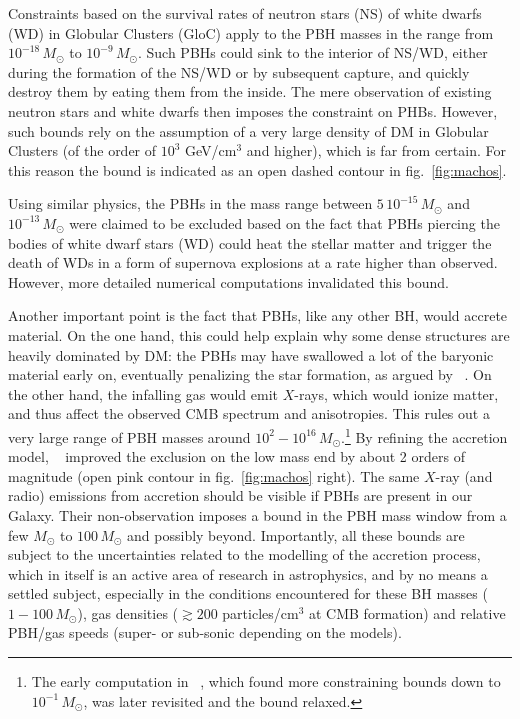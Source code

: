 Constraints based on the survival rates of neutron stars (NS) of white dwarfs (WD) in Globular Clusters (GloC) apply to the PBH masses in the range
from  $10^{-18}\, M_\odot$ to $10^{-9} \, M_\odot$. Such PBHs could sink to the interior of NS/WD, either during the formation of the NS/WD or by subsequent capture, and quickly destroy them by eating them from the inside. The mere observation of existing neutron stars and white dwarfs then imposes the constraint on PHBs. However, such bounds rely on the assumption of a very large density of DM in Globular Clusters (of the order of $10^3$ GeV/cm$^3$ and higher), which is far from certain. For this reason the bound is indicated as an open dashed contour in fig.~\ref{fig:machos}.

Using similar physics, the PBHs in the mass range between $5\, 10^{-15} \, M_\odot$ and $10^{-13} \, M_\odot$ were claimed to be excluded based on the fact that PBHs piercing the bodies of white dwarf stars (WD) could heat the stellar matter and trigger the death of WDs in a form of supernova explosions at a rate higher than observed.
However, more detailed numerical computations invalidated this bound. 

Another important point is the fact that PBHs, like any other BH, would accrete material. 
On the one hand, this could help explain why some dense structures are heavily dominated by DM: the PBHs may have swallowed a lot of the baryonic material early on, eventually penalizing the star formation, as argued by ~\cite{PBH}.
On the other hand, the infalling gas would emit $X$-rays, which would ionize matter, and thus affect the observed CMB spectrum and anisotropies. 
This rules out a very large range of PBH masses around  $10^2 - 10^{16}\, M_\odot$.\footnote{The early computation in ~\cite{PBHconstraints}, which found more constraining bounds down to $10^{-1}\, M_\odot$, was later revisited and the bound relaxed.} By refining the accretion model, ~\cite{PBHconstraints} improved the exclusion on the low mass end by about 2 orders of magnitude (open pink contour in fig.~\ref{fig:machos} right). 
The same $X$-ray (and radio) emissions from accretion should be visible if PBHs are present in our Galaxy. 
Their non-observation 
imposes a bound in the PBH mass window from a few $M_\odot$ to $100 \, M_\odot$ and possibly beyond.
Importantly, all these bounds are subject to the uncertainties related to the modelling of the accretion process, which in itself  is an active area of research in astrophysics, and by no means a settled subject, especially in the conditions encountered for  
these BH masses ($1-100\, M_\odot$), gas densities ($\gtrsim 200$ particles/cm$^3$ at CMB formation) and relative PBH/gas speeds (super- or sub-sonic depending on the models).

